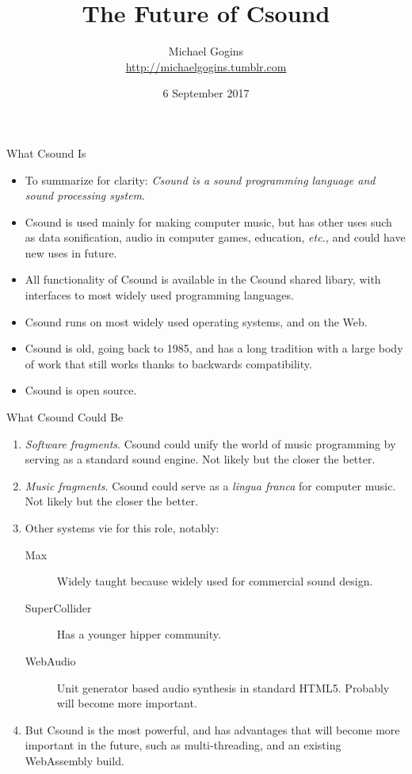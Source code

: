 \documentclass{beamer}
\title[Future Csound] %
{The Future of Csound}
\author[Gogins] %
{Michael Gogins\\
\url{http://michaelgogins.tumblr.com} 
}
\institute[Irreducible Productions] %
{
  Irreducible Productions\\
  New York
}
\date[6 September 2017] %
{6 September 2017}
\begin{document}

\begin{frame}
  \titlepage
\end{frame}

\begin{frame}{What Csound Is}
    \begin{itemize}
        \item     
            To summarize for clarity: \textit{Csound is a sound programming 
language and sound processing system}.
        \item
            Csound is used mainly for making computer music, but has other 
uses such as data sonification, audio in computer games, 
education, \textit{etc.}, and could have new uses in future.
        \item
            All functionality of Csound is available in the Csound shared 
libary, with interfaces to most widely used programming languages.
        \item
            Csound runs on most widely used operating systems, and on the Web.
        \item
            Csound is old, going back to 1985, and has a long tradition with a 
large body of work that still works thanks to backwards compatibility.
        \item 
            Csound is open source.
    \end{itemize}    
\end{frame}

\begin{frame}{What Csound Could Be}
    \begin{enumerate}
        \item \textit{Software fragments}. Csound could unify the world of 
music programming by serving as a standard sound engine. Not likely but the 
closer the better.
        \item \textit{Music fragments}. Csound could serve as a \textit{lingua 
franca} for computer music. Not likely but the closer the 
better.
        \item Other systems vie for this role, notably:
            \begin{description}
             \item[Max] Widely taught because widely used for 
commercial sound design.
             \item[SuperCollider] Has a younger hipper community.
             \item[WebAudio] Unit generator based audio synthesis in standard 
HTML5. Probably will become more important.
            \end{description}
        \item But Csound is the most powerful, and has advantages that will 
become more important in the future, such as multi-threading, and an existing 
WebAssembly build.
    \end{enumerate}    
\end{frame}
\end{document}
